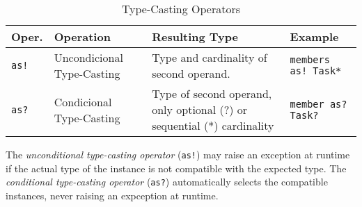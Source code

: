 \begin{table}[htbp]
\centering
\begin{tabular}
{ L{1cm} L{3cm} L{4.5cm} l }
\hline
Oper. & Operation & Resulting Type & Example \\
\hline
\verb|as!| & Uncondicional Type-Casting & Type and cardinality of second operand. & \verb|members as! Task*| \\
\verb|as?| & Condicional Type-Casting & Type of second operand,
only optional (?) or sequential (*) cardinality & \verb|member as? Task?|
\end{tabular}
\caption{Type-Casting Operators}
\label{tab:type-casting}
\end{table}

The \emph{unconditional type-casting operator} (\verb|as!|)
may raise an exception at runtime
if the actual type of the instance is not compatible with the expected type.
The \emph{conditional type-casting operator} (\verb|as?|)
automatically selects the compatible instances,
never raising an expception at runtime.
